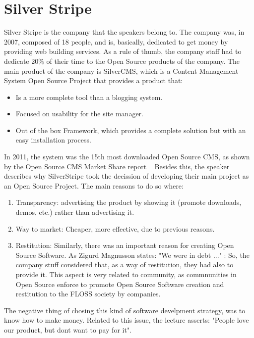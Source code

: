 \documentclass[11pt]{article}
\begin{document}
\section{Silver Stripe}
Silver Stripe is the company that the speakers belong to. The company was, in 2007, composed of 18 people, and is, basically, dedicated to get money by providing web building services.
As a rule of thumb, the company staff had to dedicate 20\% of their time to the Open Source products of the company.
The main product of the company is SilverCMS, which is a Content Management System Open Source Project that provides a product that:
\begin{itemize}\itemsep0pt
\item{Is a more complete tool than a blogging system}.
\item{Focused on usability for the site manager}.
\item{Out of the box Framework, which provides a complete solution but with an easy installation process}.
\end{itemize}
In 2011, the system was the 15th most downloaded Open Source CMS, as shown by the Open Source CMS Market Share report ~\cite{CMS00}
Besides this, the speaker describes why SilverStripe took the decission of developing their main project as an Open Source Project. The main reasons to do so where:
\begin{enumerate}\itemsep0pt
\item{Transparency}: advertising the product by showing it (promote downloads, demos, etc.) rather than advertising it.
\item{Way to market}: Cheaper, more effective, due to previous reasons.
\item{Restitution}: Similarly, there was an important reason for creating Open Source Software. As Zigurd Magnusson states:
"We were in debt ..." : So, the company stuff considered that, as a way of restitution, they had also to provide it.  This aspect is very related to community, as commnunities in Open Source enforce to promote Open Source Software creation and restitution to the FLOSS society by companies.
\end{enumerate}
The negative thing of chosing this kind of software develpment strategy, was to know how to make money. Related to this issue, the lecture asserts: "People love our product, but dont want to pay for it".
\end{document}
